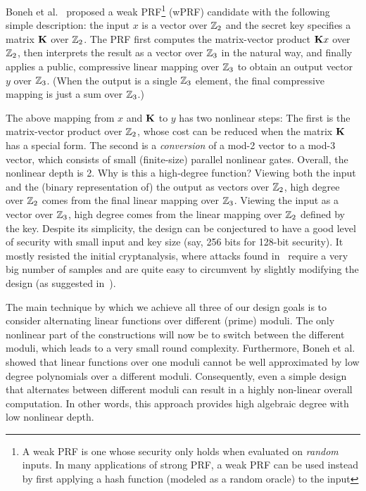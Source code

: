 Boneh et al.~\cite{boneh2018-darkmatter} proposed a weak PRF\footnote{A weak PRF is one whose security only holds when evaluated on {\em random} inputs. In many applications of strong PRF, a weak PRF can be used instead by first applying a hash function (modeled as a random oracle) to the input} (wPRF) candidate with the following simple description: the input $x$ is a vector over  $\mathbb{Z}_2$ and the secret key specifies a matrix $\mat{K}$ over  $\mathbb{Z}_2$. The PRF first computes the matrix-vector product $\mat{K}x$ over  $\mathbb{Z}_2$, then interprets the result as a vector over $\mathbb{Z}_3$ in the natural way,  and finally applies a public, compressive linear mapping over $\mathbb{Z}_3$ to obtain an output vector $y$ over $\mathbb{Z}_3$. (When the output is a single $\mathbb{Z}_3$ element, the final compressive mapping is just a sum over $\mathbb{Z}_3$.)

The above mapping from $x$ and $\mat K$ to $y$ has two nonlinear steps: The first is the matrix-vector product over $\mathbb{Z}_2$, whose cost can be reduced when the matrix $\mat K$ has a special form. The second is a {\em conversion} of a mod-2 vector to a mod-3 vector, which consists of small  (finite-size) parallel nonlinear gates.  Overall, the nonlinear depth is 2. Why is this a high-degree function? Viewing both the input and the (binary representation of) the output as vectors over $\mathbb{Z}_2$, high degree over $\mathbb{Z}_2$ comes from the final linear mapping over $\mathbb{Z}_3$. Viewing the input as a vector over $\mathbb{Z}_3$, high degree comes from the linear mapping over $\mathbb{Z}_2$ defined by the key.  Despite its simplicity, the design can be conjectured to have a good level of security with small input and key size (say, 256 bits for 128-bit security). It mostly resisted the initial cryptanalysis, where attacks found in~\cite{cheon2020-adventures} require a very big number of samples and are quite easy to circumvent by slightly modifying the design (as suggested in~\cite{cheon2020-adventures}).

\iffalse
The main technique by which we achieve all three of our design goals is to consider alternating linear functions over different (prime) moduli. The only nonlinear part of the constructions will now be to switch between the different moduli, which leads to a very small round complexity. Furthermore, Boneh et al.~\cite{boneh2018-darkmatter} showed that linear functions over one moduli cannot be well approximated by low degree polynomials over a different moduli. Consequently, even a simple design that alternates between different moduli can result in a highly non-linear overall computation. In other words, this approach provides high algebraic degree with low nonlinear depth. 

